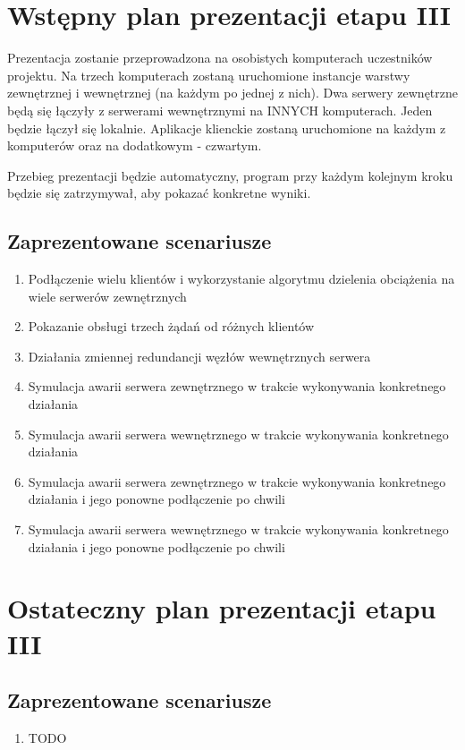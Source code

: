 \section[Wstępny plan prezentacji etapu III]{Wstępny plan prezentacji etapu III}
\par{Prezentacja zostanie przeprowadzona na osobistych komputerach uczestników projektu. Na trzech komputerach zostaną uruchomione instancje warstwy zewnętrznej i wewnętrznej (na każdym po jednej z nich). Dwa serwery zewnętrzne będą się łączyły z serwerami wewnętrznymi na INNYCH komputerach. Jeden będzie łączył się lokalnie. Aplikacje klienckie zostaną uruchomione na każdym z komputerów oraz na dodatkowym - czwartym.}

\par{Przebieg prezentacji będzie automatyczny, program przy każdym kolejnym kroku będzie się zatrzymywał, aby pokazać konkretne wyniki.}

\subsection[Zaprezentowane scenariusze]{Zaprezentowane scenariusze}
\begin{enumerate}
\item Podłączenie wielu klientów i wykorzystanie algorytmu dzielenia obciążenia na wiele serwerów zewnętrznych
\item Pokazanie obsługi trzech żądań od różnych klientów
\item Działania zmiennej redundancji węzłów wewnętrznych serwera
\item Symulacja awarii serwera zewnętrznego w trakcie wykonywania konkretnego działania
\item Symulacja awarii serwera wewnętrznego w trakcie wykonywania konkretnego działania
\item Symulacja awarii serwera zewnętrznego w trakcie wykonywania konkretnego działania i jego ponowne podłączenie po chwili
\item Symulacja awarii serwera wewnętrznego w trakcie wykonywania konkretnego działania i jego ponowne podłączenie po chwili
\end{enumerate}

\section[Ostateczny plan prezentacji etapu III]{Ostateczny plan prezentacji etapu III}
\par{}

\par{}

\subsection[Zaprezentowane scenariusze]{Zaprezentowane scenariusze}
\begin{enumerate}
\item TODO
\end{enumerate}